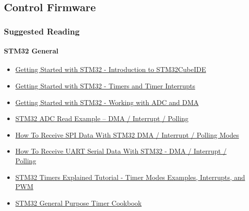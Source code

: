

\subsection{Control Firmware}

\subsubsection{Suggested Reading}

\paragraph{STM32 General}

\begin{itemize}
    

    \item \href{https://www.digikey.com/en/maker/projects/getting-started-with-stm32-introduction-to-stm32cubeide/6a6c60a670c447abb90fd0fd78008697}{Getting Started with STM32 - Introduction to STM32CubeIDE}
    
    \item \href{https://www.digikey.com/en/maker/projects/getting-started-with-stm32-timers-and-timer-interrupts/d08e6493cefa486fb1e79c43c0b08cc6}{Getting Started with STM32 - Timers and Timer Interrupts}
    
    \item \href{https://www.digikey.com/en/maker/projects/getting-started-with-stm32-working-with-adc-and-dma/f5009db3a3ed4370acaf545a3370c30c}{Getting Started with STM32 - Working with ADC and DMA}
    
    \item \href{https://deepbluembedded.com/stm32-adc-read-example-dma-interrupt-polling/}{STM32 ADC Read Example – DMA / Interrupt / Polling}
    
    \item \href{https://deepbluembedded.com/how-to-receive-spi-with-stm32-dma-interrupt/}{How To Receive SPI Data With STM32 DMA / Interrupt / Polling Modes}
    
    \item \href{https://deepbluembedded.com/how-to-receive-uart-serial-data-with-stm32-dma-interrupt-polling/}{How To Receive UART Serial Data With STM32 - DMA / Interrupt / Polling}
    
    \item \href{https://deepbluembedded.com/stm32-timers-tutorial-hardware-timers-explained/}{STM32 Timers Explained Tutorial - Timer Modes Examples, Interrupts, and PWM}
    
    \item \href{https://www.st.com/resource/en/application_note/dm00236305-generalpurpose-timer-cookbook-for-stm32-microcontrollers-stmicroelectronics.pdf}{STM32 General Purpose Timer Cookbook}

\end{itemize}

